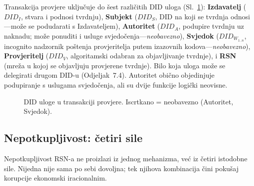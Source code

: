 \documentclass[11pt,a4paper,twocolumn]{article}
\begin{document}
Transakcija provjere uključuje do šest različitih DID uloga (Sl.~\ref{fig:roles}): \textbf{Izdavatelj} ($DID_I$, stvara i podnosi tvrdnju), \textbf{Subjekt} ($DID_S$, DID na koji se tvrdnja odnosi---može se podudarati s Izdavateljem), \textbf{Autoritet} ($DID_A$, podupire tvrdnju uz naknadu; može ponuditi i usluge svjedočenja---\emph{neobavezno}), \textbf{Svjedok} ($DID_{W_{1..n}}$, incognito nadzornik poštenja provjeritelja putem izazovnih kodova---\emph{neobavezno}), \textbf{Provjeritelj} ($DID_V$, algoritamski odabran za objavljivanje tvrdnje), i \textbf{RSN} (mreža u kojoj se objavljuju provjerene tvrdnje). Bilo koja uloga može se delegirati drugom DID-u (Odjeljak~7.4). Autoritet obično objedinjuje podupiranje s uslugama svjedočenja, ali su dvije funkcije logički neovisne.

\begin{figure}[ht]
\centering
{}
\caption{DID uloge u transakciji provjere. Iscrtkano = neobavezno (Autoritet, Svjedok).}
\label{fig:roles}
\end{figure}

\subsection{Nepotkupljivost: četiri sile}

Nepotkupljivost RSN-a ne proizlazi iz jednog mehanizma, već iz četiri istodobne sile. Nijedna nije sama po sebi dovoljna; tek njihova kombinacija čini pokušaj korupcije ekonomski iracionalnim.
\end{document}
